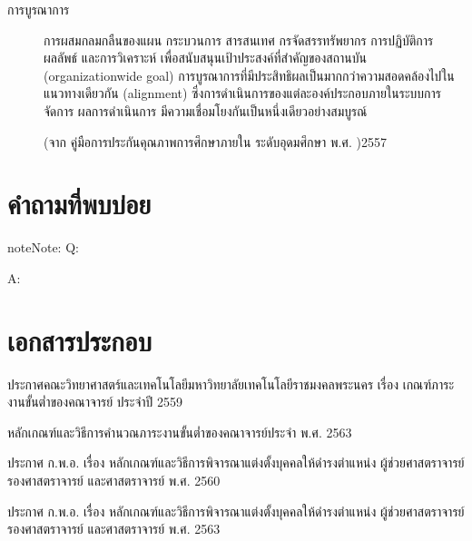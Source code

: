 \documentclass[a4paper,12pt,english]{sphinxmanual}
\begin{document}
\begin{description}
\item[{การบูรณาการ\label{\detokenize{glossary:term-11}}}] \leavevmode
การผสมกลมกลืนของแผน กระบวนการ สารสนเทศ กรจัดสรรทรัพยากร การปฏิบัติการ ผลลัพธ์ และการวิเคราะห์ เพื่อสนับสนุนเป้าประสงค์ที่สำคัญของสถานบัน (organization\sphinxhyphen{}wide goal) การบูรณาการที่มีประสิทธิผลเป็นมากกว่าความสอดคล้องไปในแนวทางเดียวกัน (alignment) ซึ่งการดำเนินการของแต่ละองค์ประกอบภายในระบบการจัดการ ผลการดำเนินการ มีความเชื่อมโยงกันเป็นหนึ่งเดียวอย่างสมบูรณ์

(จาก คู่มือการประกันคุณภาพการศึกษาภายใน ระดับอุดมศึกษา พ.ศ. )2557

\end{description}


\chapter{คำถามที่พบบ่อย}
\label{\detokenize{faq:id1}}\label{\detokenize{faq::doc}}
\begin{sphinxadmonition}{note}{Note:}
Q:

A:
\end{sphinxadmonition}


\chapter{เอกสารประกอบ}
\label{\detokenize{official_documents:id1}}\label{\detokenize{official_documents::doc}}
ประกาศคณะวิทยาศาสตร์และเทคโนโลยีมหาวิทยาลัยเทคโนโลยีราชมงคลพระนคร เรื่อง เกณฑ์ภาระงานขั้นต่ำของคณาจารย์ ประจำปี 2559

หลักเกณฑ์และวิธีการคำนวณภาระงานขั้นต่ำของคณาจารย์ประจำ พ.ศ. 2563

ประกาศ ก.พ.อ. เรื่อง หลักเกณฑ์และวิธีการพิจารณาแต่งตั้งบุคคลให้ดำรงตำแหน่ง ผู้ช่วยศาสตราจารย์ รองศาสตราจารย์ และศาสตราจารย์ พ.ศ. 2560

ประกาศ ก.พ.อ. เรื่อง หลักเกณฑ์และวิธีการพิจารณาแต่งตั้งบุคคลให้ดำรงตำแหน่ง ผู้ช่วยศาสตราจารย์ รองศาสตราจารย์ และศาสตราจารย์ พ.ศ. 2563



\renewcommand{\indexname}{Index}
\printindex
\end{document}
